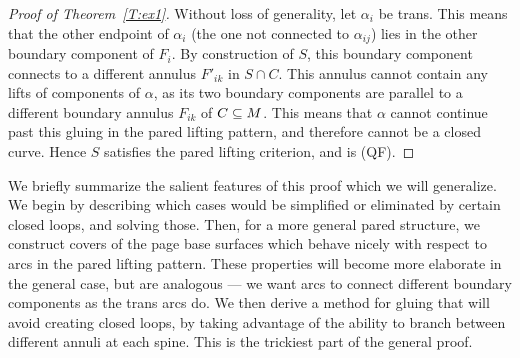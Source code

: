 \begin{proof}[Proof of Theorem~\ref{T:ex1}]
Without loss of generality, let $\alpha_i$ be trans. This means that the other
endpoint of $\alpha_i$ (the one not connected to $\alpha_{ij}$) lies in the
other boundary component of $F_i$. By construction of $S$, this boundary
component connects to a different annulus $F'_{ik}$ in $S\cap C$. This annulus
cannot contain any lifts of components of $\alpha$, as its two boundary
components are parallel to a different boundary annulus $F_{ik}$ of $C\subseteq M$.
This means that $\alpha$ cannot continue past this gluing in the pared lifting
pattern, and therefore cannot be a closed curve. Hence $S$ satisfies the pared
lifting criterion, and is (QF).

\end{proof}

We briefly summarize the salient features of this proof which we will
generalize.  We begin by describing which cases would be simplified or
eliminated by certain closed loops, and solving those. Then, for a more general
pared structure, we construct covers of the page base surfaces which behave
nicely with respect to arcs in the pared lifting pattern.  These properties
will become more elaborate in the general case, but are analogous --- we want
arcs to connect different boundary components as the trans arcs do.  We then
derive a method for gluing that will avoid creating closed loops, by taking
advantage of the ability to branch between different annuli at each spine. This
is the trickiest part of the general proof.
